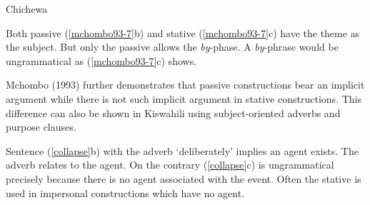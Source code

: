 \documentclass[output=paper]{langscibook}
\begin{document}
\begin{exe}
\ex Chichewa \citet[7]{Mchombo:1993aa} \label{mchombo93-7}{
\begin{xlist}
\end{xlist}
}
\end{exe}

Both passive (\ref{mchombo93-7}b) and stative (\ref{mchombo93-7}c) have the theme as the subject. But only the passive allows the \textit{by}-phase. A \textit{by}-phrase would be ungrammatical as (\ref{mchombo93-7}c) shows. 

Mchombo (1993) further demonstrates that passive constructions bear an implicit argument while there is not such implicit argument in stative constructions. This difference can also be shown in Kiswahili using subject-oriented adverbs and purpose clauses.  

\begin{exe}
\ex\label{collapse}
\begin{xlist}
\end{xlist}
\end{exe}
Sentence (\ref{collapse}b) with the adverb `deliberately' implies an agent exists. The adverb relates to the agent. On the contrary (\ref{collapse}c) is ungrammatical precisely because there is no agent associated with the event. Often the stative is used in impersonal constructions which have no agent.  
\end{document}
